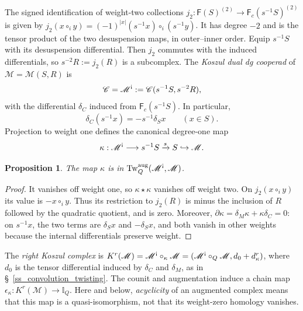 \documentclass[11pt,letterpaper]{article}
\numberwithin{equation}{section}
\theoremstyle{plain}
\newtheorem{prop}[thm]{Proposition}
\theoremstyle{definition}
\theoremstyle{remark}
\newcommand{\antishriek}{%
	\mathord{\mathchoice
		{\rotatebox[origin=c]{180}{$\displaystyle !$}}
		{\rotatebox[origin=c]{180}{$\textstyle !$}}
		{\rotatebox[origin=c]{180}{$\scriptstyle !$}}
		{\rotatebox[origin=c]{180}{$\scriptscriptstyle !$}}}}
\begin{document}
The signed identification of weight-two collections $j_2:\mathsf F(S)^{(2)}\longrightarrow\mathsf F_c(s^{-1}S)^{(2)}$ is given by $j_2(x\circ_i y)=(-1)^{|x|}(s^{-1}x)\circ_i(s^{-1}y)$.
It has degree $-2$ and is the tensor product of the two desuspension maps, in outer--inner order. Equip $s^{-1}S$ with its desuspension differential. Then $j_2$ commutes with the induced differentials, so $s^{-2}R:=j_2(R)$ is a subcomplex. The \textit{Koszul dual dg cooperad} of $\mathscr M=\mathscr M(S,R)$ is
\begin{equation}\label{eq_koszul_dual_definition}
 \mathscr C=\mathscr M^{\antishriek}:=\mathscr C(s^{-1}S,s^{-2}R),
\end{equation}
with the differential $\delta_C$ induced from $\mathsf F_c(s^{-1}S)$. In particular,
\begin{equation}\label{eq_koszul_dual_internal_differential}
 \delta_C(s^{-1}x)=-s^{-1}\delta_Sx
 \qquad (x\in S).
\end{equation}
Projection to weight one defines the canonical degree-one map
\begin{equation*}\kappa:\mathscr M^{\antishriek}\longrightarrow s^{-1}S
 \xrightarrow{s}S\hookrightarrow\mathscr M.
\end{equation*}
\begin{prop}\label{prop:koszul_twisting_fc}
The map $\kappa$ is in $\operatorname{Tw}^{\mathrm{aug}}_Q(\mathscr M^{\antishriek},\mathscr M)$.
\end{prop}
\begin{proof}
It vanishes off weight one, so $\kappa\star\kappa$ vanishes off weight two. On $j_2(x\circ_i y)$ its value is $-x\circ_i y$. Thus its restriction to $j_2(R)$ is minus the inclusion of $R$ followed by the quadratic quotient, and is zero. Moreover, $\partial\kappa=\delta_M\kappa+\kappa\delta_C=0$: on $s^{-1}x$, the two terms are $\delta_Sx$ and $-\delta_Sx$, and both vanish in other weights because the internal differentials preserve weight.
\end{proof}

The \textit{right Koszul complex} is
$K^r(\mathscr M)=\mathscr M^{\antishriek}\circ_\kappa\mathscr M
 = (\mathscr M^{\antishriek}\circ_Q\mathscr M,d_0+d_\kappa^r )$,
where $d_0$ is the tensor differential induced by $\delta_C$ and $\delta_M$, as in \S~\ref{ss_convolution_twisting}.
The counit and augmentation induce a chain map
$\epsilon_\kappa:K^r(\mathscr M)\to\mathbb I_Q$.
Here and below, \textit{acyclicity} of an augmented complex means that this map is a quasi-isomorphism, not that its weight-zero homology vanishes.
\end{document}
